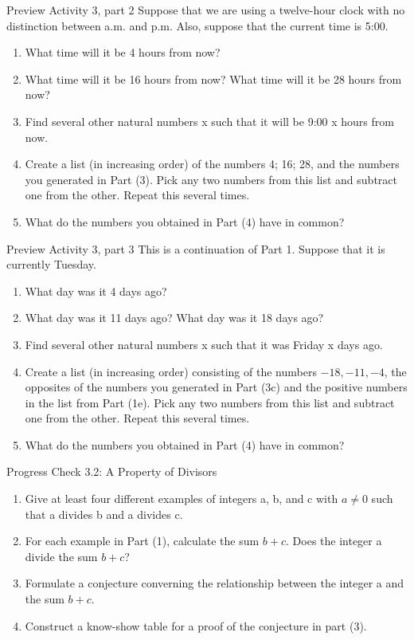 \documentclass{beamer}
\begin{document}
\begin{frame}{Preview Activity 3, part 2}
	Suppose that we are using a twelve-hour clock with no distinction between
	a.m. and p.m. Also, suppose that the current time is 5:00.
	\begin{enumerate}
		\item What time will it be 4 hours from now?\pause
		\item What time will it be 16 hours from now? What time will it be 28 hours
		from now? \pause
		\item Find several other natural numbers x such that it will be 9:00 x hours
		from now.\pause
		\item Create a list (in increasing order) of the numbers 4; 16; 28, and the
		numbers you generated in Part (3). Pick any two numbers from this
		list and subtract one from the other. Repeat this several times. \pause
		\item What do the numbers you obtained in Part (4) have in common?
	\end{enumerate}
\end{frame}

\begin{frame}{Preview Activity 3, part 3}
	This is a continuation of Part 1. Suppose that it is currently Tuesday.
	\begin{enumerate}
		\item What day was it 4 days ago?\pause
		\item What day was it 11 days ago? What day was it 18 days ago? \pause
		\item Find several other natural numbers x such that it was Friday x days
		ago. \pause
		\item Create a list (in increasing order) consisting of the numbers
		$-18, -11, -4$, the opposites of the numbers you generated in Part (3c)
		and the positive numbers in the list from Part (1e). Pick any two numbers
		from this list and subtract one from the other. Repeat this several
		times. \pause
		\item What do the numbers you obtained in Part (4) have in common?
	\end{enumerate}
\end{frame}

\begin{frame}{Progress Check 3.2: A Property of Divisors}
	\begin{enumerate}
		\item Give at least four different examples of integers a, b, and c with $a \neq 0$ such
		that a divides b and a divides c.\\[.1 in]\pause
		\item For each example in Part (1), calculate the sum $b+c$. Does the integer a
		divide the sum $b + c$?\\[.1 in]\pause
		\item Formulate a conjecture converning the relationship between the integer a and the sum $b+c$.\\[.1 in]\pause
		\item Construct a know-show table for a proof of the conjecture in part (3).
	\end{enumerate}
\end{frame}
\end{document}
